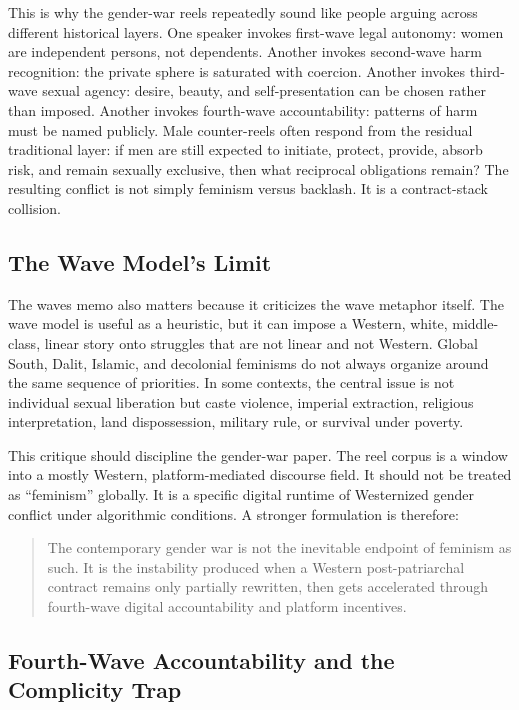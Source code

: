 \documentclass[12pt]{article}
\begin{document}
This is why the gender-war reels repeatedly sound like people arguing across different historical layers. One speaker invokes first-wave legal autonomy: women are independent persons, not dependents. Another invokes second-wave harm recognition: the private sphere is saturated with coercion. Another invokes third-wave sexual agency: desire, beauty, and self-presentation can be chosen rather than imposed. Another invokes fourth-wave accountability: patterns of harm must be named publicly. Male counter-reels often respond from the residual traditional layer: if men are still expected to initiate, protect, provide, absorb risk, and remain sexually exclusive, then what reciprocal obligations remain? The resulting conflict is not simply feminism versus backlash. It is a contract-stack collision.

\subsection{The Wave Model's Limit}

The waves memo also matters because it criticizes the wave metaphor itself. The wave model is useful as a heuristic, but it can impose a Western, white, middle-class, linear story onto struggles that are not linear and not Western. Global South, Dalit, Islamic, and decolonial feminisms do not always organize around the same sequence of priorities. In some contexts, the central issue is not individual sexual liberation but caste violence, imperial extraction, religious interpretation, land dispossession, military rule, or survival under poverty.

This critique should discipline the gender-war paper. The reel corpus is a window into a mostly Western, platform-mediated discourse field. It should not be treated as ``feminism'' globally. It is a specific digital runtime of Westernized gender conflict under algorithmic conditions. A stronger formulation is therefore:

\begin{quote}
The contemporary gender war is not the inevitable endpoint of feminism as such. It is the instability produced when a Western post-patriarchal contract remains only partially rewritten, then gets accelerated through fourth-wave digital accountability and platform incentives.
\end{quote}

\subsection{Fourth-Wave Accountability and the Complicity Trap}
\end{document}
